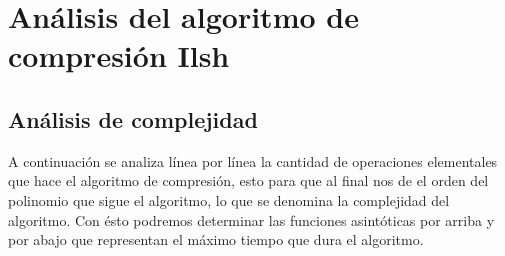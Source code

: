 \documentclass[letterpaper]{article}
\begin{document}
\pagebreak

\section{Análisis del algoritmo de compresión Ilsh}


\subsection{Análisis de complejidad}

A continuación se analiza línea por línea la cantidad de operaciones elementales que hace el algoritmo de compresión, esto para que al final nos de el orden del polinomio que sigue el algoritmo, lo que se denomina la complejidad del algoritmo. Con ésto podremos determinar las funciones asintóticas por arriba y por abajo que representan el máximo tiempo que dura el algoritmo.\\
\end{document}
